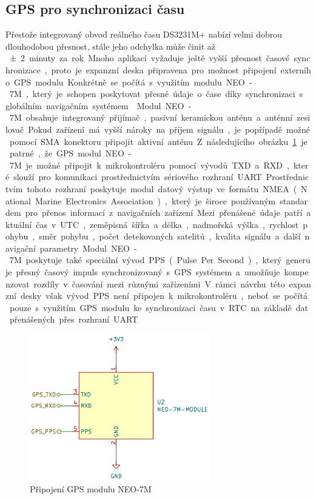\subsection{GPS pro synchronizaci času}
Přestože integrovaný obvod reálného času DS3231M+ nabízí velmi dobrou dlouhodobou přesnost, stále jeho odchylka může činit až \SI{\pm2} minuty za rok. Mnoho aplikací vyžaduje ještě vyšší přesnost časové synchronizace, proto je expanzní deska připravena pro možnost připojení externího GPS modulu. Konkrétně se~počítá s využitím modulu NEO-7M, který je schopen poskytovat přesné údaje o~čase díky synchronizaci s globálním navigačním systémem.~\cite{NEO7M_manual}

Modul NEO-7M obsahuje integrovaný přijímač, pasivní keramickou anténu a~anténní zesilovač. Pokud zařízení má vyšší nároky na příjem signálu, je popřípadě možné pomocí SMA konektoru připojit aktivní anténu. Z následujícího obrázku~\ref{fig:neo-7m} je patrné, že GPS modul NEO-7M je možné připojit k~mikrokontroléru pomocí vývodů TXD a~RXD, které slouží pro komunikaci prostřednictvím sériového rozhraní UART. Prostřednictvím tohoto rozhraní poskytuje modul datový výstup ve~formátu NMEA (National Marine Electronics Association), který je široce používaným standardem pro přenos informací z~navigačních zařízení. Mezi přenášené údaje patří aktuální čas v~UTC, zeměpisná šířka a~délka, nadmořská výška, rychlost pohybu, směr pohybu, počet detekovaných satelitů, kvalita signálu a~další navigační parametry. Modul NEO-7M poskytuje také speciální vývod PPS (Pulse Per Second), který generuje přesný časový impuls synchronizovaný s GPS systémem a~umožňuje kompenzovat rozdíly v časování mezi různými zařízeními. V~rámci návrhu této expanzní desky však vývod PPS není připojen k~mikrokontroléru, neboť se~počítá pouze s~využitím GPS modulu ke~synchronizaci času v~RTC na~základě dat přenášených přes rozhraní UART.~\cite{NEO7M_manual}

\begin{figure}[h]
    \centering
    \includegraphics[width=0.70\textwidth]{obrazky-figures/neo-7m.pdf}
    
    \caption{Připojení GPS modulu NEO-7M}
    \label{fig:neo-7m}
\end{figure}

